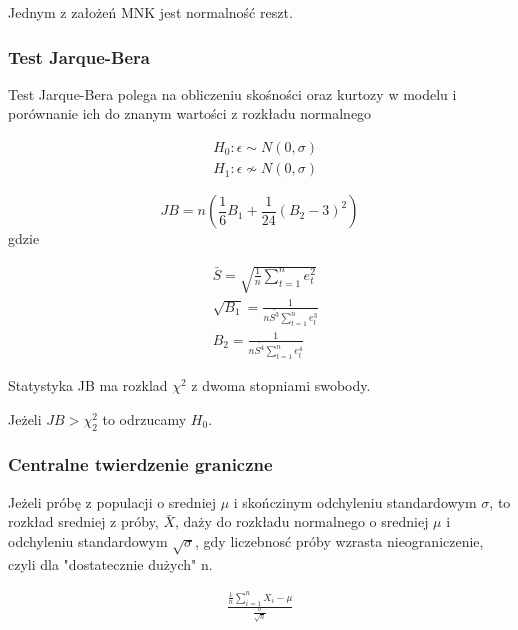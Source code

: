 Jednym z założeń MNK jest normalność reszt.

\subsubsection{Test Jarque-Bera}
Test Jarque-Bera polega na obliczeniu skośności oraz kurtozy w modelu i porównanie ich do znanym wartości z rozkładu normalnego

\begin{equation}
    \begin{split}
        &H_0: \epsilon \sim N(0,\sigma) \\
        &H_1: \epsilon \not\sim N(0,\sigma)
    \end{split}
\end{equation}


\begin{equation}
    JB = n (\frac{1}{6}B_1 + \frac{1}{24}(B_2 -3)^2)
\end{equation}
gdzie

\begin{equation}
    \begin{split}
        &\bar{S} = \sqrt{\frac{1}{n}\sum_{t=1}^{n}e^2_t} \\
        &\sqrt{B_1} = \frac{1}{n\bar{S^3}\sum_{t=1}^{n}e^3_t}  \\
        & B_2 = \frac{1}{n\bar{S^4}\sum_{t=1}^{n}{e^4_t}}
    \end{split}
\end{equation}

Statystyka JB ma rozklad \(\chi^2\) z dwoma stopniami swobody.

Jeżeli \(JB > \chi^2_2\) to odrzucamy \(H_0\).

\subsubsection{Centralne twierdzenie graniczne}

Jeżeli próbę z populacji o sredniej \(\mu\) i skończinym odchyleniu standardowym \(\sigma \), to rozkład sredniej z próby, \(\bar{X}\), daży do rozkładu normalnego o sredniej \(\mu\) i odchyleniu standardowym \(\sqrt{\sigma} \), gdy liczebnosć próby wzrasta nieograniczenie, czyli dla "dostatecznie dużych" n.

\begin{equation}
    \begin{split}
        \frac{\frac{1}{n} \sum_{i=1}^{n} X_i - \mu}{\frac{\sigma}{\sqrt{n}}}
    \end{split}
\end{equation}

